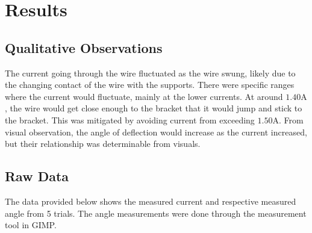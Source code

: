\section*{Results}

\subsection*{Qualitative Observations}

The current going through the wire fluctuated as the wire swung, likely due to the changing contact of the wire with the supports.
There were specific ranges where the current would fluctuate, mainly at the lower currents.
At around $1.40\si{\ampere}$, the wire would get close enough to the bracket that it would jump and stick to the bracket.
This was mitigated by avoiding current from exceeding $1.50\si{\ampere}$.
From visual observation, the angle of deflection would increase as the current increased, but their relationship was determinable
from visuals.

\subsection*{Raw Data}

The data provided below shows the measured current and respective measured angle from 5 trials.
The angle measurements were done through the measurement tool in GIMP.

